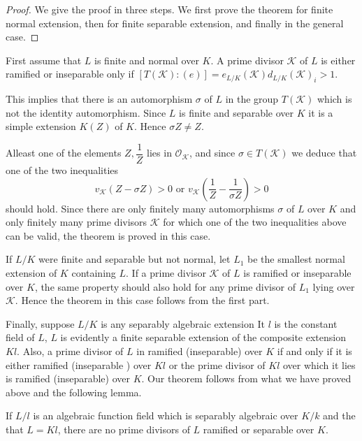 \begin{proof}
  We give the proof in three steps. We first prove the theorem for
  finite normal extension, then for finite separable extension, and
  finally in the general case. 
\end{proof}

First assume that $L$ is finite and normal over $K$. A prime divisor
$\mathscr{K}$ of $L$ is either ramified or inseparable only if
$[T(\mathscr{K}):(e)]= e_{L/K}(\mathscr{K}) d_{L /K}(\mathscr{K})_i
>1$. 

This implies that there is an automorphism $\sigma$ of $L$ in the
group $T(\mathscr{K})$ which is not the identity automorphism. Since
$L$ is finite and separable over $K$ it is a simple extension $K(Z)$
of $K$. Hence $\sigma Z \neq Z$. 

Al\pageoriginale least one of the elements $Z, \dfrac{1}{Z}$ lies in
$\mathscr{O}_\mathscr{K}$, and since $\sigma \in T(\mathscr{K})$ we
deduce that one of the two inequalities 
$$
v_\mathscr{K}(Z- \sigma Z) > 0 \text{ or } v_\mathscr{K} \left(\frac{1}{Z}-
\frac{1}{\sigma Z}\right) > 0 
$$
should hold. Since there are only finitely many automorphisms $\sigma$
of $L$  over $K$ and only finitely many prime divisors $\mathscr{K}$
for which one of the two inequalities above can be valid, the theorem
is proved in this case. 

If $L/K$ were finite and separable but not normal, let $L_1$  be the
smallest normal extension of $K$ containing $L$. If a prime divisor
$\mathscr{K}$ of  $L$ is ramified or inseparable over $K$, the same
property should also hold for any prime divisor of $L_1$ lying over
$\mathscr{K}$. Hence the theorem in this case follows from the first
part. 

Finally, suppose $L/K$ is any separably algebraic extension It $l$
is the constant field of $L$, $L$ is evidently a finite separable
extension of the composite extension $Kl$. Also, a prime divisor of
$L$ in ramified (inseparable) over $K$ if and only  if it is either
ramified (inseparable ) over $Kl$ or the prime divisor of $Kl$ over
which it lies is ramified (inseparable) over $K$. Our theorem follows
from what we have proved above and the following lemma. 

\begin{lemma*}%
  If $L/l$ is an algebraic function field which is separably
  algebraic over $K/k$ and the that $L =Kl$, there are no prime
  divisors of $L$ ramified or separable over $K$. 
\end{lemma*}

